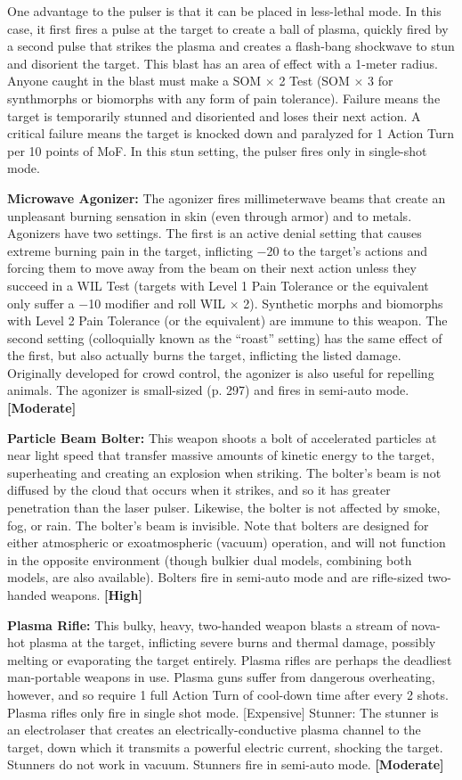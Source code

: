 One advantage to the pulser is that it can be placed in less-lethal mode. In this case, it first fires a pulse at the target to create a ball of plasma, quickly fired by a second pulse that strikes the plasma and creates a flash-bang shockwave to stun and disorient the target. This blast has an area of effect with a 1-meter radius. Anyone caught in the blast must make a SOM $\times$ 2 Test (SOM $\times$ 3 for synthmorphs or biomorphs with any form of pain tolerance). Failure means the target is temporarily stunned and disoriented and loses their next action. A critical failure means the target is knocked down and paralyzed for 1 Action Turn per 10 points of MoF. In this stun setting, the pulser fires only in single-shot mode. 

\textbf{Microwave Agonizer:} The agonizer fires millimeterwave beams that create an unpleasant burning sensation in skin (even through armor) and to metals. Agonizers have two settings. The first is an active denial setting that causes extreme burning pain in the target, inflicting $-$20 to the target’s actions and forcing them to move away from the beam on their next action unless they succeed in a WIL Test (targets with Level 1 Pain Tolerance or the equivalent only suffer a $-$10 modifier and roll WIL $\times$ 2). Synthetic morphs and biomorphs with Level 2 Pain Tolerance (or the equivalent) are immune to this weapon. The second setting (colloquially known as the ``roast'' setting) has the same effect of the first, but also actually burns the target, inflicting the listed damage. Originally developed for crowd control, the agonizer is also useful for repelling animals. The agonizer is small-sized (p. 297) and fires in semi-auto mode. \textbf{[Moderate]} 

\textbf{Particle Beam Bolter:} This weapon shoots a bolt of accelerated particles at near light speed that transfer massive amounts of kinetic energy to the target, superheating and creating an explosion when striking. The bolter’s beam is not diffused by the cloud that occurs when it strikes, and so it has greater penetration than the laser pulser. Likewise, the bolter is not affected by smoke, fog, or rain. The bolter’s beam is invisible. Note that bolters are designed for either atmospheric or exoatmospheric (vacuum) operation, and will not function in the opposite environment (though bulkier dual models, combining both models, are also available). Bolters fire in semi-auto mode and are rifle-sized two-handed weapons. \textbf{[High]} 

\textbf{Plasma Rifle:} This bulky, heavy, two-handed weapon blasts a stream of nova-hot plasma at the target, inflicting severe burns and thermal damage, possibly melting or evaporating the target entirely. Plasma rifles are perhaps the deadliest man-portable weapons in use. Plasma guns suffer from dangerous overheating, however, and so require 1 full Action Turn of cool-down time after every 2 shots. Plasma rifles only fire in single shot mode. [Expensive] Stunner: The stunner is an electrolaser that creates an electrically-conductive plasma channel to the target, down which it transmits a powerful electric current, shocking the target. Stunners do not work in vacuum. Stunners fire in semi-auto mode. \textbf{[Moderate]} 

